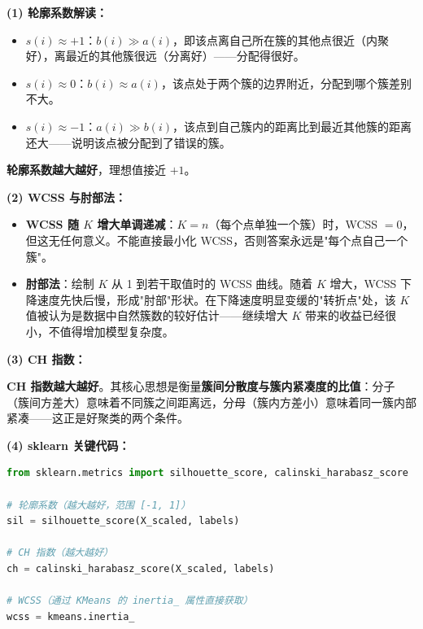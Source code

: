 \documentclass[a4paper,11pt]{ctexart}
\begin{document}
\begin{solutionbox}[参考答案与详细解析]
    \textbf{(1) 轮廓系数解读：}

    \begin{itemize}
        \item \textbf{$s(i) \approx +1$}：$b(i) \gg a(i)$，即该点离自己所在簇的其他点很近（内聚好），离最近的其他簇很远（分离好）——分配得很好。
        \item \textbf{$s(i) \approx 0$}：$b(i) \approx a(i)$，该点处于两个簇的边界附近，分配到哪个簇差别不大。
        \item \textbf{$s(i) \approx -1$}：$a(i) \gg b(i)$，该点到自己簇内的距离比到最近其他簇的距离还大——说明该点被分配到了错误的簇。
    \end{itemize}

    \textbf{轮廓系数越大越好}，理想值接近 $+1$。

    \textbf{(2) WCSS 与肘部法：}

    \begin{itemize}
        \item \textbf{WCSS 随 $K$ 增大单调递减}：$K=n$（每个点单独一个簇）时，WCSS $= 0$，但这无任何意义。不能直接最小化 WCSS，否则答案永远是"每个点自己一个簇"。
        \item \textbf{肘部法}：绘制 $K$ 从 1 到若干取值时的 WCSS 曲线。随着 $K$ 增大，WCSS 下降速度先快后慢，形成"肘部"形状。在下降速度明显变缓的"转折点"处，该 $K$ 值被认为是数据中自然簇数的较好估计——继续增大 $K$ 带来的收益已经很小，不值得增加模型复杂度。
    \end{itemize}

    \textbf{(3) CH 指数：}

    \textbf{CH 指数越大越好}。其核心思想是衡量\textbf{簇间分散度与簇内紧凑度的比值}：分子（簇间方差大）意味着不同簇之间距离远，分母（簇内方差小）意味着同一簇内部紧凑——这正是好聚类的两个条件。

    \textbf{(4) sklearn 关键代码：}

    \begin{lstlisting}[language=Python]
from sklearn.metrics import silhouette_score, calinski_harabasz_score

# 轮廓系数（越大越好，范围 [-1, 1]）
sil = silhouette_score(X_scaled, labels)

# CH 指数（越大越好）
ch = calinski_harabasz_score(X_scaled, labels)

# WCSS（通过 KMeans 的 inertia_ 属性直接获取）
wcss = kmeans.inertia_
    \end{lstlisting}
\end{solutionbox}
\end{document}
